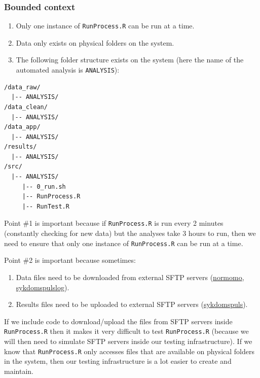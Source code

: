 \documentclass[12pt,]{article}
\providecommand{\tightlist}{%
  \setlength{\itemsep}{0pt}\setlength{\parskip}{0pt}}
\theoremstyle{definition}
\theoremstyle{definition}
\theoremstyle{definition}
\theoremstyle{remark}
\begin{document}
\subsubsection{Bounded context}\label{bounded-context}

\begin{enumerate}
\def\labelenumi{\arabic{enumi}.}
\tightlist
\item
  Only one instance of \texttt{RunProcess.R} can be run at a time.
\item
  Data only exists on physical folders on the system.
\item
  The following folder structure exists on the system (here the name of
  the automated analysis is \texttt{ANALYSIS}):
\end{enumerate}

\begin{verbatim}
/data_raw/
  |-- ANALYSIS/
/data_clean/
  |-- ANALYSIS/
/data_app/
  |-- ANALYSIS/
/results/
  |-- ANALYSIS/
/src/
  |-- ANALYSIS/
     |-- 0_run.sh
     |-- RunProcess.R
     |-- RunTest.R
\end{verbatim}

Point \#1 is important because if \texttt{RunProcess.R} is run every 2
minutes (constantly checking for new data) but the analyses take 3 hours
to run, then we need to ensure that only one instance of
\texttt{RunProcess.R} can be run at a time.

Point \#2 is important because sometimes:

\begin{enumerate}
\def\labelenumi{\arabic{enumi}.}
\tightlist
\item
  Data files need to be downloaded from external SFTP servers
  (\href{https://folkehelseinstituttet.github.io/dashboards_normomo/}{normomo},
  \href{https://folkehelseinstituttet.github.io/dashboards_sykdomspuls_log/}{sykdomspulslog}).
\item
  Results files need to be uploaded to external SFTP servers
  (\href{https://folkehelseinstituttet.github.io/dashboards_sykdomspuls/}{sykdomspuls}).
\end{enumerate}

If we include code to download/upload the files from SFTP servers inside
\texttt{RunProcess.R} then it makes it very difficult to test
\texttt{RunProcess.R} (because we will then need to simulate SFTP
servers inside our testing infrastructure). If we know that
\texttt{RunProcess.R} only accesses files that are available on physical
folders in the system, then our testing infrastructure is a lot easier
to create and maintain.
\end{document}
